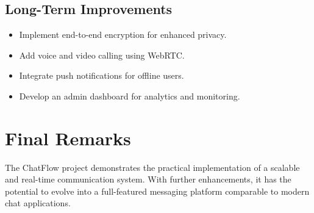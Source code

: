 \documentclass[12pt,a4paper]{report}
\begin{document}
\subsection{Long-Term Improvements}

\begin{itemize}
    \item Implement end-to-end encryption for enhanced privacy.
    \item Add voice and video calling using WebRTC.
    \item Integrate push notifications for offline users.
    \item Develop an admin dashboard for analytics and monitoring.
\end{itemize}

\section{Final Remarks}

The ChatFlow project demonstrates the practical implementation of a scalable and real-time communication system. With further enhancements, it has the potential to evolve into a full-featured messaging platform comparable to modern chat applications.
\end{document}
